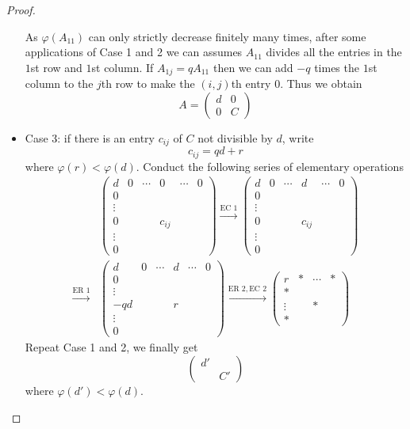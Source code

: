 \documentclass[a4paper]{article}
\begin{document}
\begin{proof}
\begin{itemize}
    As \(\varphi(A_{11})\) can only strictly decrease finitely many times, after some applications of Case 1 and 2 we can assumes \(A_{11}\) divides all the entries in the \(1\)st row and \(1\)st column. If \(A_{1j} = q A_{11}\) then we can add \(-q\) times the \(1\)st column to the \(j\)th row to make the \((i, j)\)th entry \(0\). Thus we obtain
    \[
      A =
      \begin{pmatrix}
        d & 0 \\
        0 & C
      \end{pmatrix}
    \]
  \item Case 3: if there is an entry \(c_{ij}\) of \(C\) not divisible by \(d\), write
    \[
      c_{ij} = qd + r
    \]
    where \(\varphi(r) < \varphi(d)\). Conduct the following series of elementary operations
    \begin{align*}
      &
        \begin{pmatrix}
          d & 0 & \cdots & 0 & \cdots & 0 \\
          0 \\
          \vdots \\
          0 & & & c_{ij} \\
          \vdots \\
          0
        \end{pmatrix}
      \stackrel{\text{EC } 1}{\to}
      \begin{pmatrix}
        d & 0 & \cdots & d & \cdots & 0 \\
        0 \\
        \vdots \\
        0 & & & c_{ij} \\
        \vdots \\
        0
      \end{pmatrix}
      \\
      \stackrel{\text{ER } 1}{\to}&
      \begin{pmatrix}
        d & 0 & \cdots & d & \cdots & 0 \\
        0 \\
        \vdots \\
        -qd & & & r \\
        \vdots \\
        0
      \end{pmatrix}
      \stackrel{\text{ER } 2, \text{EC } 2}{\to}
      \begin{pmatrix}
        r & * & \cdots & * \\
        * \\
        \vdots & & * \\
        *
      \end{pmatrix}
    \end{align*}
    Repeat Case 1 and 2, we finally get
    \[
      \begin{pmatrix}
        d' \\
        & C'
      \end{pmatrix}
    \]
    where \(\varphi(d') < \varphi(d)\).
  \end{itemize}


\end{proof}
\end{document}

